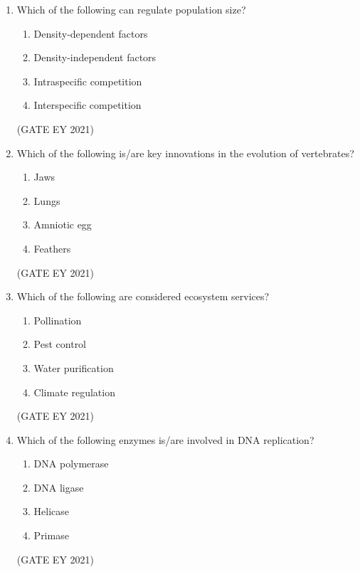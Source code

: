\documentclass[journal]{IEEEtran}
\begin{document}
\begin{enumerate}
    \item Which of the following can regulate population size?
    \begin{enumerate}
        \item Density-dependent factors
        \item Density-independent factors
        \item Intraspecific competition
        \item Interspecific competition
    \end{enumerate}
    \hfill{(GATE EY 2021)}
    
    \item Which of the following is/are key innovations in the evolution of vertebrates?
    \begin{multicols}{4}    
    \begin{enumerate}
        \item Jaws
        \item Lungs
        \item Amniotic egg
        \item Feathers
    \end{enumerate}
    \end{multicols}
    \hfill{(GATE EY 2021)}
    
    \item Which of the following are considered ecosystem services?
     \begin{multicols}{2}
    \begin{enumerate}   
        \item Pollination
        \item Pest control
        \item Water purification
        \item Climate regulation
    \end{enumerate}
    \end{multicols}
    \hfill{(GATE EY 2021)}
    
    \item Which of the following enzymes is/are involved in DNA replication?
     \begin{multicols}{4}
    \begin{enumerate}
        \item DNA polymerase
        \item DNA ligase
        \item Helicase
        \item Primase
    \end{enumerate}
    \end{multicols}
    \hfill{(GATE EY 2021)}
    

\end{enumerate}
\end{document}
